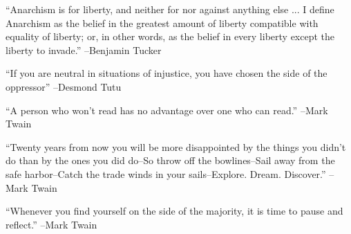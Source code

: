 \documentclass{article}%
\begin{document}
\vspace{1mm}%
\begin{minipage}{\textwidth}%
\flushleft%
“Anarchism is for liberty, and neither for nor against anything else ... I define Anarchism as the belief in the greatest amount of liberty compatible with equality of liberty; or, in other words, as the belief in every liberty except the liberty to invade.”%
\linebreak%
\vspace{1mm}%
–Benjamin Tucker%
\linebreak%
\vspace{1mm}%
\end{minipage}%
\linebreak%
\vspace{1mm}%
\begin{minipage}{\textwidth}%
\flushleft%
“If you are neutral in situations of injustice, you have chosen the side of the oppressor”%
\linebreak%
\vspace{1mm}%
–Desmond Tutu%
\linebreak%
\vspace{1mm}%
\end{minipage}%
\linebreak%
\vspace{1mm}%
\begin{minipage}{\textwidth}%
\flushleft%
“A person who won't read has no advantage over one who can read.”%
\linebreak%
\vspace{1mm}%
–Mark Twain%
\linebreak%
\vspace{1mm}%
\end{minipage}%
\linebreak%
\vspace{1mm}%
\begin{minipage}{\textwidth}%
\flushleft%
“Twenty years from now you will be more disappointed by the things you didn't do than by the ones you did do–So throw off the bowlines–Sail away from the safe harbor–Catch the trade winds in your sails–Explore. Dream. Discover.”%
\linebreak%
\vspace{1mm}%
–Mark Twain%
\linebreak%
\vspace{1mm}%
\end{minipage}%
\linebreak%
\vspace{1mm}%
\begin{minipage}{\textwidth}%
\flushleft%
“Whenever you find yourself on the side of the majority, it is time to pause and reflect.”%
\linebreak%
\vspace{1mm}%
–Mark Twain%
\linebreak%
\vspace{1mm}%
\end{minipage}%
\end{document}
